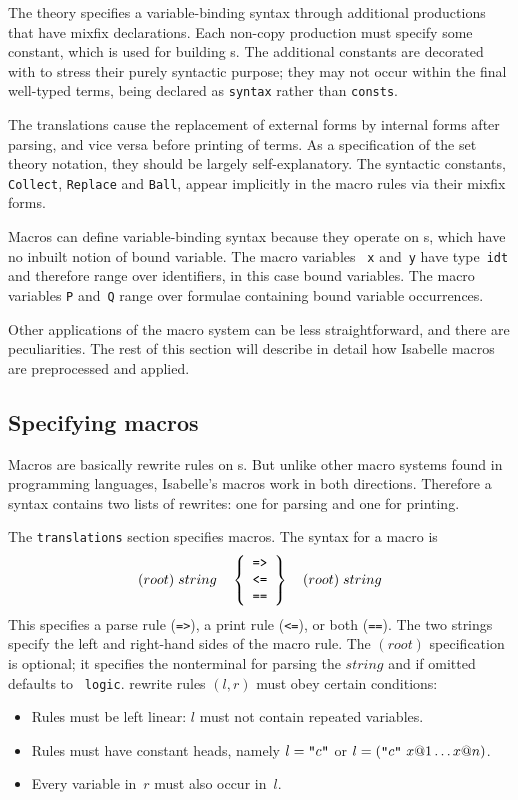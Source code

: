 The theory specifies a variable-binding syntax through additional productions
that have mixfix declarations.  Each non-copy production must specify some
constant, which is used for building \AST{}s.  The
additional constants are decorated with {\tt\at} to stress their purely
syntactic purpose; they may not occur within the final well-typed terms,
being declared as {\tt syntax} rather than {\tt consts}.

The translations cause the replacement of external forms by internal forms
after parsing, and vice versa before printing of terms.  As a specification
of the set theory notation, they should be largely self-explanatory.  The
syntactic constants, {\tt\at Collect}, {\tt\at Replace} and {\tt\at Ball},
appear implicitly in the macro rules via their mixfix forms.

Macros can define variable-binding syntax because they operate on \AST{}s,
which have no inbuilt notion of bound variable.  The macro variables {\tt
  x} and~{\tt y} have type~{\tt idt} and therefore range over identifiers,
in this case bound variables.  The macro variables {\tt P} and~{\tt Q}
range over formulae containing bound variable occurrences.

Other applications of the macro system can be less straightforward, and
there are peculiarities.  The rest of this section will describe in detail
how Isabelle macros are preprocessed and applied.


\subsection{Specifying macros}
Macros are basically rewrite rules on \AST{}s.  But unlike other macro
systems found in programming languages, Isabelle's macros work in both
directions.  Therefore a syntax contains two lists of rewrites: one for
parsing and one for printing.

The {\tt translations} section specifies macros.  The syntax for a macro is
\[ (root)\; string \quad
   \left\{\begin{array}[c]{c} \mbox{\tt =>} \\ \mbox{\tt <=} \\ \mbox{\tt ==} \end{array}
   \right\} \quad
   (root)\; string
\]
%
This specifies a parse rule ({\tt =>}), a print rule ({\tt <=}), or both
({\tt ==}).  The two strings specify the left and right-hand sides of the
macro rule.  The $(root)$ specification is optional; it specifies the
nonterminal for parsing the $string$ and if omitted defaults to {\tt
  logic}.  \AST{} rewrite rules $(l, r)$ must obey certain conditions:
\begin{itemize}
\item Rules must be left linear: $l$ must not contain repeated variables.

\item Rules must have constant heads, namely $l = \mbox{\tt "}c\mbox{\tt "}$ or $l =
  (\mbox{\tt "}c\mbox{\tt "} ~ x@1 \ldots x@n)$.

\item Every variable in~$r$ must also occur in~$l$.
\end{itemize}

